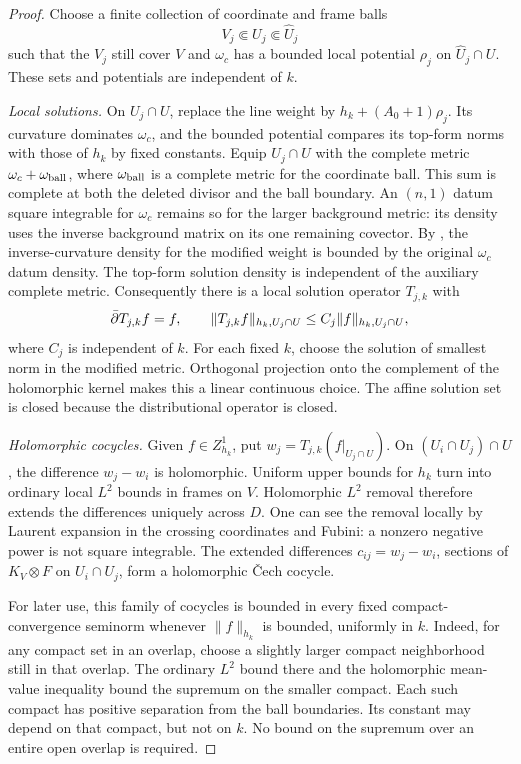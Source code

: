 \begin{proof}
Choose a finite collection of coordinate and frame balls
\[
 V_j\Subset U_j\Subset\widehat U_j
\]
such that the $V_j$ still cover $V$ and $\omega_c$ has a bounded local
potential $\rho_j$ on $\widehat U_j\cap U$.  These sets and potentials
are independent of $k$.

\emph{Local solutions.}
On $U_j\cap U$, replace the line weight by
$h_k+(A_0+1)\rho_j$.  Its curvature dominates $\omega_c$, and the
bounded potential compares its top-form norms with those of $h_k$ by
fixed constants.  Equip $U_j\cap U$ with the complete metric
$\omega_c+\omega_{\rm ball}$, where $\omega_{\rm ball}$ is a complete
metric for the coordinate ball.  This sum is complete at both the
deleted divisor and the ball boundary.  An $(n,1)$ datum square
integrable for $\omega_c$ remains so for the larger background metric:
its density uses the inverse background matrix on its one remaining
covector.  By , the inverse-curvature density
for the modified weight is bounded by the original $\omega_c$ datum
density.  The top-form solution density is independent of the
auxiliary complete metric.  Consequently there is a local solution
operator $T_{j,k}$ with
\begin{equation}\label{eq:local-primitive-bound}
 \bar\partial T_{j,k}f=f,\qquad
 \|T_{j,k}f\|_{h_k,U_j\cap U}
       \le C_j\|f\|_{h_k,U_j\cap U},
\end{equation}
where $C_j$ is independent of $k$.  For each fixed $k$, choose the
solution of smallest norm in the modified metric.  Orthogonal
projection onto the complement of the holomorphic kernel makes this
a linear continuous choice.  The affine solution set is closed because
the distributional operator is closed.

\emph{Holomorphic cocycles.}
Given $f\in Z^1_{h_k}$, put $w_j=T_{j,k}(f|_{U_j\cap U})$.
On $(U_i\cap U_j)\cap U$, the difference $w_j-w_i$ is holomorphic.
Uniform upper bounds for $h_k$ turn
 into ordinary local $L^2$ bounds in
frames on $V$.  Holomorphic $L^2$ removal therefore extends the
differences uniquely across $D$.  One can see the removal locally by
Laurent expansion in the crossing coordinates and Fubini: a nonzero
negative power is not square integrable.  The extended differences
$c_{ij}=w_j-w_i$, sections of $K_V\otimes F$ on $U_i\cap U_j$, form a holomorphic
\v Cech cocycle.

For later use, this family of cocycles is bounded in every fixed
compact-convergence seminorm whenever $\|f\|_{h_k}$ is bounded,
uniformly in $k$.  Indeed, for any compact set in an overlap, choose a
slightly larger compact neighborhood still in that overlap.  The
ordinary $L^2$ bound there and the holomorphic mean-value inequality
bound the supremum on the smaller compact.  Each such compact has
positive separation from the ball boundaries.  Its constant may
depend on that compact, but not on $k$.  No bound on the supremum over
an entire open overlap is required.


\end{proof}
